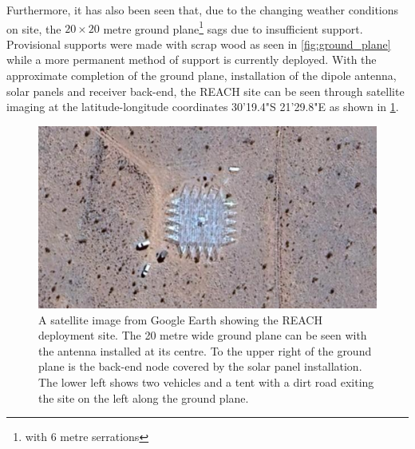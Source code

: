 Furthermore, it has also been seen that, due to the changing weather conditions on site, the $20 \times 20$ metre ground plane\footnote{with 6 metre serrations} sags due to insufficient support. Provisional supports were made with scrap wood as seen in \cref{fig:ground_plane} while a more permanent method of support is currently deployed. With the approximate completion of the ground plane, installation of the dipole antenna, solar panels and receiver back-end, the REACH site can be seen through satellite imaging at the latitude-longitude coordinates 30'19.4"S 21'29.8"E as shown in \cref{fig:sat_image}.
\begin{figure}
    \centering
    \includegraphics[width=\textwidth]{sat_image}
    \caption{A satellite image from Google Earth showing the REACH deployment site. The 20 metre wide ground plane can be seen with the antenna installed at its centre. To the upper right of the ground plane is the back-end node covered by the solar panel installation. The lower left shows two vehicles and a tent with a dirt road exiting the site on the left along the ground plane.}
    \label{fig:sat_image}
\end{figure}
